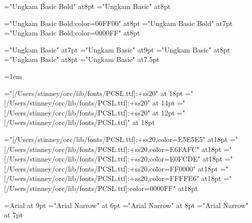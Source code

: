 

\font\slnmfont="Ungkam Basic Bold" at8pt
\font\sltgfont="Ungkam Basic" at8pt


\font\slnmfontw="Ungkam Basic Bold:color=00FF00" at8pt
\font\slnmfontx="Ungkam Basic Bold" at7pt
\font\slnmfonty="Ungkam Basic Bold:color=0000FF" at8pt

\font\akafont="Ungkam Basic" at7pt
\font\sldistfont="Ungkam Basic" at9pt
\font\oidfont="Ungkam Basic" at8pt
\font\oidfontx="Ungkam Basic" at8pt
\font\zatufont="Ungkam Basic" at7.5pt

\oidfont{}=1em \showthe{}

\font\pcssXX="[/Users/stinney/orc/lib/fonts/PCSL.ttf]:+ss20" at 18pt
\font\pcssxx="[/Users/stinney/orc/lib/fonts/PCSL.ttf]:+ss20" at 14pt
\font\pcssxxx="[/Users/stinney/orc/lib/fonts/PCSL.ttf]:+ss20" at 12pt
\font\pcxviii="[/Users/stinney/orc/lib/fonts/PCSL.ttf]" at 18pt

\font\pceee="[/Users/stinney/orc/lib/fonts/PCSL.ttf]:+ss20,color=E5E5E5" at18pt
\font\pceff="[/Users/stinney/orc/lib/fonts/PCSL.ttf]:+ss20,color=E6FAFC" at18pt
\font\pcefd="[/Users/stinney/orc/lib/fonts/PCSL.ttf]:+ss20,color=E0FCDE" at18pt
\font\pcfee="[/Users/stinney/orc/lib/fonts/PCSL.ttf]:+ss20,color=FF0000" at18pt
\font\pcffe="[/Users/stinney/orc/lib/fonts/PCSL.ttf]:+ss20,color=FFFFE6" at18pt
\font\pcblu="[/Users/stinney/orc/lib/fonts/PCSL.ttf]:color=0000FF" at18pt

\let\redpc\pcfee
\let\newgh\pcblu

\font\helv=Arial at 9pt
\font\helvx="Arial Narrow" at 6pt
\font\helvy="Arial Narrow" at 8pt
\font\helvz="Arial Narrow" at 7pt

\let\everymathextra\relax
\let\preamble\relax


\def\appendixstr{Appendix }


\let\seq\relax
\let\lname\relax
\let\sname\relax
\let\uname\relax
\let\chars\relax
\let\names\relax
\let\glyph\relax
\let\rglyf\relax
\let\image\relax
\let\notes\relax
\let\stags\relax

\let\sqdbcun\relax
\let\sqdbpua\relax
\let\sqseq\relax
\let\sqinv\relax
\let\sqchr\relax

